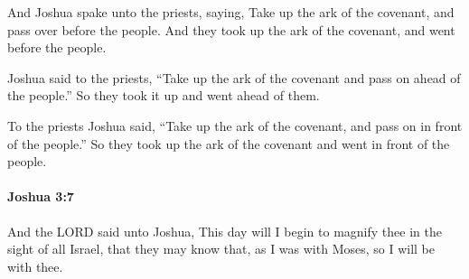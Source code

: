 			\begin{versebox}
					\item[BHS] 
					\item[ASV] And Joshua spake unto the priests, saying, Take up the ark of the covenant, and pass over before the people. And they took up the ark of the covenant, and went before the people.
					\item[NIV] Joshua said to the priests, “Take up the ark of the covenant and pass on ahead of the people.” So they took it up and went ahead of them.
					\item[NRSV] To the priests Joshua said, “Take up the ark of the covenant, and pass on in front of the people.” So they took up the ark of the covenant and went in front of the people.
			\end{versebox}

		\paragraph{Joshua 3:7} %
			\label{JOSHUA-3-7}

			And the LORD said unto Joshua, This day will I begin to magnify thee in the sight of all Israel, that they may know that, as I was with Moses, so I will be with thee.

